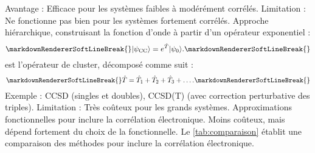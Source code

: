 {}\markdownRendererUlBeginTight
\markdownRendererUlItem Avantage : Efficace pour les systèmes faibles à modérément corrélés.\markdownRendererUlItemEnd 
\markdownRendererUlItem Limitation : Ne fonctionne pas bien pour les systèmes fortement corrélés.\markdownRendererUlItemEnd 
\markdownRendererUlEndTight \markdownRendererInterblockSeparator
{}\markdownRendererOlBegin
{}\markdownRendererInterblockSeparator
{}\markdownRendererUlBegin
\markdownRendererUlItem Approche hiérarchique, construisant la fonction d’onde à partir d’un opérateur exponentiel :\markdownRendererSoftLineBreak
{}\begin{equation}\markdownRendererSoftLineBreak
{}|\psi_{\text{CC}}\rangle = e^{\hat{T}} |\psi_0\rangle .\markdownRendererSoftLineBreak
{}\end{equation}\markdownRendererUlItemEnd 
\markdownRendererUlItem {} est l’opérateur de cluster, décomposé comme suit :\markdownRendererSoftLineBreak
{}\begin{equation}\markdownRendererSoftLineBreak
{}\hat{T} = \hat{T}_1 + \hat{T}_2 + \hat{T}_3 + \dots .\markdownRendererSoftLineBreak
{}\end{equation}\markdownRendererUlItemEnd 
\markdownRendererUlItem Exemple : CCSD (singles et doubles), CCSD(T) (avec correction perturbative des triples).\markdownRendererUlItemEnd 
\markdownRendererUlItem Limitation : Très coûteux pour les grands systèmes.\markdownRendererUlItemEnd 
\markdownRendererUlEnd \markdownRendererOlItemEnd 
{}\markdownRendererInterblockSeparator
{}\markdownRendererUlBeginTight
\markdownRendererUlItem Approximations fonctionnelles pour inclure la corrélation électronique.\markdownRendererUlItemEnd 
\markdownRendererUlItem Moins coûteux, mais dépend fortement du choix de la fonctionnelle.\markdownRendererUlItemEnd 
\markdownRendererUlEndTight \markdownRendererOlItemEnd 
\markdownRendererOlEnd \markdownRendererInterblockSeparator
{}Le \autoref{tab:comparaison} établit une comparaison des méthodes pour inclure la corrélation électronique.\markdownRendererInterblockSeparator
{}\markdownRendererInterblockSeparator
{}
\markdownRendererSectionEnd 
\markdownRendererSectionEnd \markdownRendererSectionBegin
{}\markdownRendererInterblockSeparator
